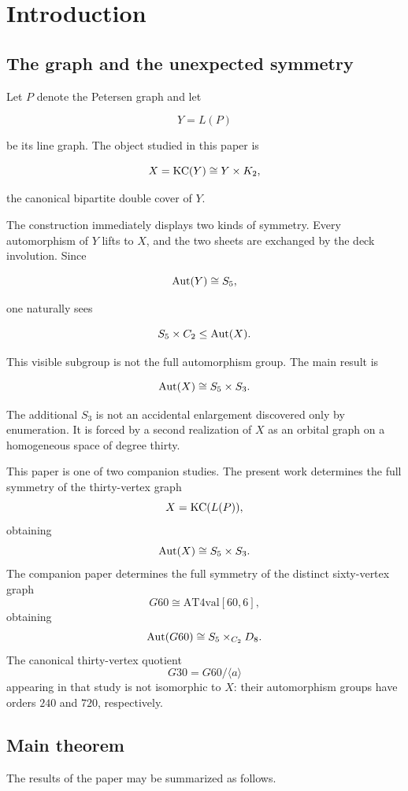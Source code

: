 \section{Introduction}

\subsection{The graph and the unexpected symmetry}

Let \(P\) denote the Petersen graph and let

\[
Y=L(P)
\]

be its line graph. The object studied in this paper is

\[
X=\operatorname{KC}(Y)\cong Y\times K_2,
\]

the canonical bipartite double cover of \(Y\).

The construction immediately displays two kinds of symmetry. Every
automorphism of \(Y\) lifts to \(X\), and the two sheets are exchanged by
the deck involution. Since

\[
\operatorname{Aut}(Y)\cong S_5,
\]

one naturally sees

\[
S_5\times C_2
\leq
\operatorname{Aut}(X).
\]

This visible subgroup is not the full automorphism group. The main result
is

\[
\operatorname{Aut}(X)\cong S_5\times S_3.
\]

The additional \(S_3\) is not an accidental enlargement discovered only
by enumeration. It is forced by a second realization of \(X\) as an
orbital graph on a homogeneous space of degree thirty.

This paper is one of two companion studies. The present work determines
the full symmetry of the thirty-vertex graph
\[
X=\operatorname{KC}(L(P)),
\]
obtaining
\[
\operatorname{Aut}(X)\cong S_5\times S_3.
\]
The companion paper determines the full symmetry of the distinct
sixty-vertex graph
\[
G60\cong \mathrm{AT4val}[60,6],
\]
obtaining
\[
\operatorname{Aut}(G60)\cong S_5\times_{C_2}D_8.
\]
The canonical thirty-vertex quotient
\[
G30=G60/\langle a\rangle
\]
appearing in that study is not isomorphic to \(X\): their automorphism
groups have orders \(240\) and \(720\), respectively.

\subsection{Main theorem}

The results of the paper may be summarized as follows.

